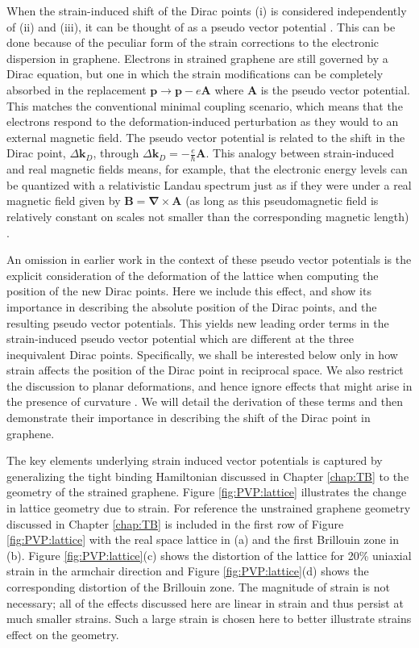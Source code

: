 When the strain-induced shift of the Dirac points (i) is considered independently of (ii) and (iii), it can be thought of as a pseudo vector potential \cite{Sasaki2005,Ando2006,Manes2007,CastroNeto2009,Vozmediano2010}.
This can be done because of the peculiar form of the strain corrections to the electronic dispersion in graphene.
Electrons in strained graphene are still governed by a Dirac equation, but one in which the strain modifications can be completely absorbed in the replacement $\bm{p} \to \bm{p}-e\bm{A}$ where $\bm{A}$ is the pseudo vector potential.
This matches the conventional minimal coupling scenario, which means that the electrons respond to the deformation-induced perturbation as they would to an external magnetic field.  
The pseudo vector potential is related to the shift in the Dirac point, $\Delta \bm{k}_D$, through $\Delta \bm{k}_D=-\frac{e}{\hbar} \bm{A}$.
This analogy between strain-induced and real magnetic fields means, for example, that the electronic energy levels can be quantized with a relativistic Landau spectrum just as if they were under a real magnetic field given by $\bm{B}=\bm{\nabla}\times\bm{A}$ (as long as this pseudomagnetic field is relatively constant on scales not smaller than the corresponding magnetic length) \cite{CastroNeto2009}.

An omission in earlier work in the context of these pseudo vector potentials is the explicit consideration of the deformation of the lattice when computing the position of the new Dirac points.
Here we include this effect, and show its importance in describing the absolute position of the Dirac points, and the resulting pseudo vector potentials.
This yields new leading order terms in the strain-induced pseudo vector potential which are different at the three inequivalent Dirac points.
Specifically, we shall be interested below only in how strain affects the position of the Dirac point in reciprocal space.
We also restrict the discussion to planar deformations, and hence ignore effects that might arise in the presence of curvature \cite{CastroNeto2009,Vozmediano2010}.
We will detail the derivation of these terms and then demonstrate their importance in describing the shift of the Dirac point in graphene.

The key elements underlying strain induced vector potentials is captured by generalizing the tight binding Hamiltonian discussed in Chapter \ref{chap:TB} to the geometry of the strained graphene.
Figure \ref{fig:PVP:lattice} illustrates the change in lattice geometry due to strain.
For reference the unstrained graphene geometry discussed in Chapter \ref{chap:TB} is included in the first row of Figure \ref{fig:PVP:lattice} with the real space lattice in (a) and the first Brillouin zone in (b).
Figure \ref{fig:PVP:lattice}(c) shows the distortion of the lattice for 20\% uniaxial strain in the armchair direction and Figure \ref{fig:PVP:lattice}(d) shows the corresponding distortion of the Brillouin zone.
The magnitude of strain is not necessary; all of the effects discussed here are linear in strain and thus persist at much smaller strains.
Such a large strain is chosen here to better illustrate strains effect on the geometry.

